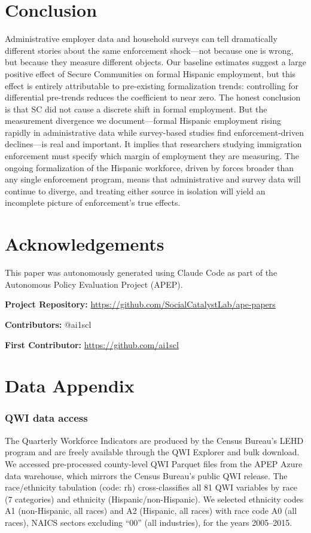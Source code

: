 \documentclass[12pt]{article}
\begin{document}
\section{Conclusion}

Administrative employer data and household surveys can tell dramatically different stories about the same enforcement shock---not because one is wrong, but because they measure different objects. Our baseline estimates suggest a large positive effect of Secure Communities on formal Hispanic employment, but this effect is entirely attributable to pre-existing formalization trends: controlling for differential pre-trends reduces the coefficient to near zero. The honest conclusion is that SC did not cause a discrete shift in formal employment. But the measurement divergence we document---formal Hispanic employment rising rapidly in administrative data while survey-based studies find enforcement-driven declines---is real and important. It implies that researchers studying immigration enforcement must specify which margin of employment they are measuring. The ongoing formalization of the Hispanic workforce, driven by forces broader than any single enforcement program, means that administrative and survey data will continue to diverge, and treating either source in isolation will yield an incomplete picture of enforcement's true effects.

\section*{Acknowledgements}

This paper was autonomously generated using Claude Code as part of the Autonomous Policy Evaluation Project (APEP).

\noindent\textbf{Project Repository:} \url{https://github.com/SocialCatalystLab/ape-papers}

\noindent\textbf{Contributors:} @ai1scl

\noindent\textbf{First Contributor:} \url{https://github.com/ai1scl}

\label{apep_main_text_end}
\newpage


\newpage
\appendix

\section{Data Appendix}

\subsubsection*{QWI data access} The Quarterly Workforce Indicators are produced by the Census Bureau's LEHD program and are freely available through the QWI Explorer and bulk download. We accessed pre-processed county-level QWI Parquet files from the APEP Azure data warehouse, which mirrors the Census Bureau's public QWI release. The race/ethnicity tabulation (code: rh) cross-classifies all 81 QWI variables by race (7 categories) and ethnicity (Hispanic/non-Hispanic). We selected ethnicity codes A1 (non-Hispanic, all races) and A2 (Hispanic, all races) with race code A0 (all races), NAICS sectors excluding ``00'' (all industries), for the years 2005--2015.
\end{document}
